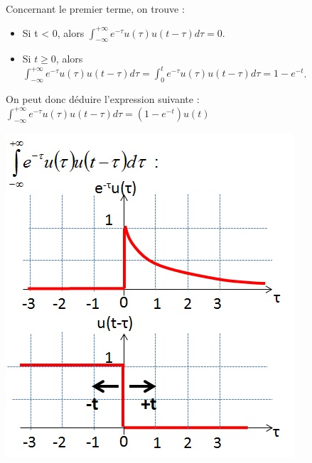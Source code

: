 	\begin{minipage}[l]{0.7\linewidth}
		Concernant le premier terme, on trouve :
		\begin{itemize}
			\item Si t < 0, alors $\int_{-\infty}^{+\infty}e^{-\tau}u(\tau)u(t-\tau)d\tau = 0$.
			\item Si $t \geq 0$, alors $\int_{-\infty}^{+\infty}e^{-\tau}u(\tau)u(t-\tau)d\tau = \int_{0}^{t}e^{-\tau}u(\tau)u(t-\tau)d\tau= 1-e^{-t}$.
		\end{itemize}
		On peut donc déduire l'expression suivante : $\int_{-\infty}^{+\infty}e^{-\tau}u(\tau)u(t-\tau)d\tau =(1-e^{-t})u(t)$
	\end{minipage} \hfill
	\begin{minipage}[c]{0.30\linewidth}
		\includegraphics[scale=0.5]{images/Ex_integrale_prod_conv1.jpg}	
	\end{minipage}



